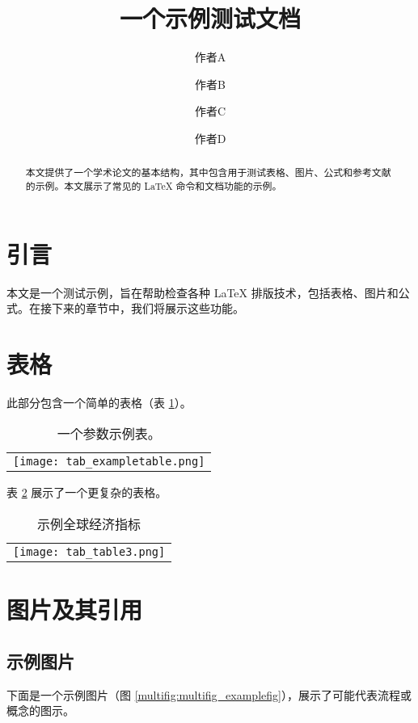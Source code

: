\documentclass[a4paper,UTF8]{ctexart}
\title{一个示例测试文档}
\author[1$\dag$]{作者A}
\author[1$\dag$]{作者B}
\author[1*]{作者C}
\author[1,2]{作者D}
\affil[1]{示例研究学院，示例大学}
\affil[2]{高级示例研究学院，示例大学}
\affil[*]{通讯作者：example.email@university.edu}
\affil[$\dag$]{这些作者对本文贡献相同。}
\begin{document}
\maketitle

\begin{abstract}
本文提供了一个学术论文的基本结构，其中包含用于测试表格、图片、公式和参考文献的示例。本文展示了常见的 LaTeX 命令和文档功能的示例。
\end{abstract}

\section{引言}

本文是一个测试示例，旨在帮助检查各种 LaTeX 排版技术，包括表格、图片和公式。在接下来的章节中，我们将展示这些功能。

\section{表格}

此部分包含一个简单的表格（表 \ref{tab:exampletable}）。


\begin{table}[htbp]
    \centering
    \caption{
        一个参数示例表。
    }
    \label{tab:exampletable}
    \begin{tabular}{l}
    \texttt{[image: tab\_exampletable.png]}
    \end{tabular}
\end{table}


表 \ref{table3} 展示了一个更复杂的表格。


\begin{table}[htbp]
    \centering
    \caption{示例全球经济指标}
    \label{table3}
    \begin{tabular}{l}
    \texttt{[image: tab\_table3.png]}
    \end{tabular}
\end{table}



\section{图片及其引用}

\subsection{示例图片}

下面是一个示例图片（图 \ref{multifig:multifig_examplefig}），展示了可能代表流程或概念的图示。
\end{document}
